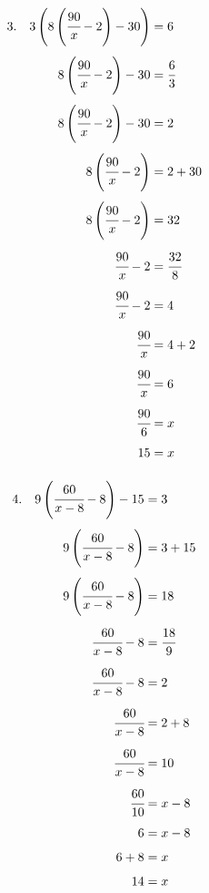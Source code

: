 \documentclass{article}
\begin{document}
\noindent
\begin{minipage}[t]{0.5000\textwidth}
\begin{align*}
3.\hspace{10pt}3\left(8\left(\cfrac{90}{x}-2\right)-30\right)&=6\\[4pt]
8\left(\cfrac{90}{x}-2\right)-30&=\cfrac{6}{3}\\[4pt]
8\left(\cfrac{90}{x}-2\right)-30&=2\\[4pt]
8\left(\cfrac{90}{x}-2\right)&=2+30\\[4pt]
8\left(\cfrac{90}{x}-2\right)&=32\\[4pt]
\cfrac{90}{x}-2&=\cfrac{32}{8}\\[4pt]
\cfrac{90}{x}-2&=4\\[4pt]
\cfrac{90}{x}&=4+2\\[4pt]
\cfrac{90}{x}&=6\\[4pt]
\cfrac{90}{6}&=x\\[4pt]
15&=x\\[4pt]
\end{align*}
\end{minipage}
\begin{minipage}[t]{0.5000\textwidth}
\begin{align*}
4.\hspace{10pt}9\left(\cfrac{60}{x-8}-8\right)-15&=3\\[4pt]
9\left(\cfrac{60}{x-8}-8\right)&=3+15\\[4pt]
9\left(\cfrac{60}{x-8}-8\right)&=18\\[4pt]
\cfrac{60}{x-8}-8&=\cfrac{18}{9}\\[4pt]
\cfrac{60}{x-8}-8&=2\\[4pt]
\cfrac{60}{x-8}&=2+8\\[4pt]
\cfrac{60}{x-8}&=10\\[4pt]
\cfrac{60}{10}&=x-8\\[4pt]
6&=x-8\\[4pt]
6+8&=x\\[4pt]
14&=x\\[4pt]
\end{align*}
\end{minipage}
\vspace{10 mm}
\end{document}
